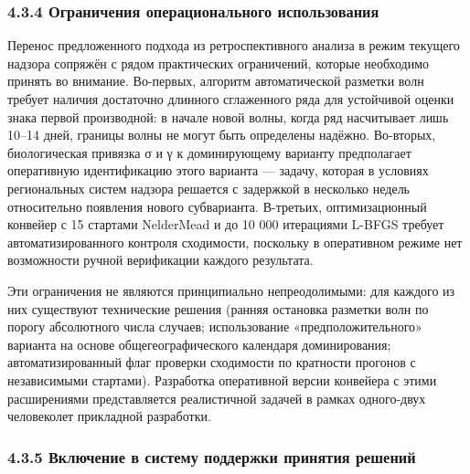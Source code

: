 \documentclass[12pt]{article}
\begin{document}
\subsubsection{4.3.4 Ограничения операционального
использования}\label{ux43eux433ux440ux430ux43dux438ux447ux435ux43dux438ux44f-ux43eux43fux435ux440ux430ux446ux438ux43eux43dux430ux43bux44cux43dux43eux433ux43e-ux438ux441ux43fux43eux43bux44cux437ux43eux432ux430ux43dux438ux44f}

Перенос предложенного подхода из ретроспективного анализа в режим
текущего надзора сопряжён с рядом практических ограничений, которые
необходимо принять во внимание. Во-первых, алгоритм автоматической
разметки волн требует наличия достаточно длинного сглаженного ряда для
устойчивой оценки знака первой производной: в начале новой волны, когда
ряд насчитывает лишь 10--14 дней, границы волны не могут быть определены
надёжно. Во-вторых, биологическая привязка σ и γ к доминирующему
варианту предполагает оперативную идентификацию этого варианта ---
задачу, которая в условиях региональных систем надзора решается с
задержкой в несколько недель относительно появления нового субварианта.
В-третьих, оптимизационный конвейер с 15 стартами NelderMead и до 10 000
итерациями L-BFGS требует автоматизированного контроля сходимости,
поскольку в оперативном режиме нет возможности ручной верификации
каждого результата.

Эти ограничения не являются принципиально непреодолимыми: для каждого из
них существуют технические решения (ранняя остановка разметки волн по
порогу абсолютного числа случаев; использование «предположительного»
варианта на основе общегеографического календаря доминирования;
автоматизированный флаг проверки сходимости по кратности прогонов с
независимыми стартами). Разработка оперативной версии конвейера с этими
расширениями представляется реалистичной задачей в рамках одного-двух
человеколет прикладной разработки.

\subsubsection{4.3.5 Включение в систему поддержки принятия
решений}\label{ux432ux43aux43bux44eux447ux435ux43dux438ux435-ux432-ux441ux438ux441ux442ux435ux43cux443-ux43fux43eux434ux434ux435ux440ux436ux43aux438-ux43fux440ux438ux43dux44fux442ux438ux44f-ux440ux435ux448ux435ux43dux438ux439}
\end{document}
